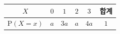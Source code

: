 {\setlength{\tabcolsep}{7pt}\renewcommand{\arraystretch}{1.35}%
\begin{tabular}{|c|c|c|c|c|c|}
\hline
$X$ & $0$ & $1$ & $2$ & $3$ & \textbf{합계} \\
\hline
$\mathrm{P}(X=x)$ & $a$ & $3a$ & $a$ & $4a$ & $1$ \\
\hline
\end{tabular}}
